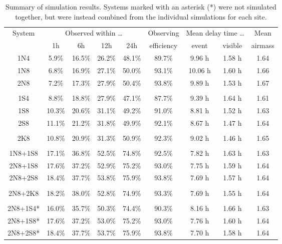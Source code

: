 \begin{colsection}
\begin{colsection}
\begin{table}[t]
    \begin{center}
        \begin{tabular}{c|cccc|c|cc|c} %
            \multirow{2}{*}{System} &
            \multicolumn{4}{c|}{Observed within \ldots} &
            Observing &
            \multicolumn{2}{c|}{Mean delay time \ldots} &
            Mean \\
                & 1h & 6h & 12h & 24h & efficiency& event & visible & airmass \\
            \midrule
            1N4 & 5.9\% & 16.5\% & 26.2\% & 48.1\% & 89.7\% & 9.96 h & 1.58 h & 1.64 \\
            1N8 & 6.8\% & 16.9\% & 27.1\% & 50.0\% & 93.1\% & 10.06 h & 1.60 h & 1.66 \\
            2N8 & 7.2\% & 17.3\% & 27.9\% & 50.4\% & 93.8\% & 9.89 h & 1.53 h & 1.67 \\
            &&&&&&&&\\
            1S4 & 8.8\% & 18.8\% & 27.9\% & 47.1\% & 87.7\% & 9.39 h & 1.64 h & 1.61 \\
            1S8 & 10.3\% & 20.6\% & 31.1\% & 49.2\% & 91.0\% & 8.81 h & 1.52 h & 1.63 \\
            2S8 & 11.1\% & 21.2\% & 31.8\% & 49.9\% & 92.1\% & 8.67 h & 1.47 h & 1.64 \\
            &&&&&&&&\\
            2K8 & 10.8\% & 20.9\% & 31.3\% & 50.9\% & 92.3\% & 9.02 h & 1.46 h & 1.65 \\
            &&&&&&&&\\
            1N8+1S8 & 17.1\% & 36.8\% & 52.5\% & 74.8\% & 92.5\% & 7.82 h & 1.63 h & 1.63 \\
            2N8+1S8 & 17.6\% & 37.2\% & 52.9\% & 75.2\% & 93.0\% & 7.75 h & 1.59 h & 1.64 \\
            2N8+2S8 & 18.4\% & 37.7\% & 53.8\% & 75.9\% & 93.8\% & 7.69 h & 1.57 h & 1.64 \\
            &&&&&&&&\\
            2N8+2K8 & 18.2\% & 38.0\% & 52.8\% & 74.9\% & 93.3\% & 7.69 h & 1.55 h & 1.64 \\
            &&&&&&&&\\
            2N8+1S4* & 16.0\% & 35.7\% & 50.3\% & 74.4\% & 90.3\% & 8.16 h & 1.66 h & 1.63 \\
            2N8+1S8* & 17.6\% & 37.2\% & 53.0\% & 75.2\% & 93.0\% & 7.76 h & 1.60 h & 1.64 \\
            2N8+2S8* & 18.4\% & 37.7\% & 53.7\% & 75.9\% & 93.8\% & 7.70 h & 1.58 h & 1.64 \\
        \end{tabular}
    \end{center}
    \caption[GW simulation results summary table]{
        Summary of simulation results. Systems marked with an asterisk (*) were not simulated together, but were instead combined from the individual simulations for each site.
    }\label{tab:gw_sim_results}
\end{table}


\end{colsection}
\end{colsection}
